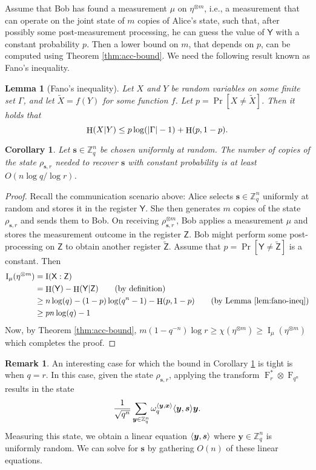 \documentclass[11pt]{article}
\theoremstyle{plain}
\newtheorem{lemma}[theorem]{Lemma}
\newtheorem{corollary}[theorem]{Corollary}
\theoremstyle{definition}
\newtheorem*{remark}{Remark}
\DeclareMathOperator{\entpy}{H}
\DeclareMathOperator{\qft}{F}
\DeclarePairedDelimiter{\abs}{\lvert}{\rvert}
\let\ket\relax
\DeclarePairedDelimiter{\ket}{\lvert}{\rangle}
\DeclarePairedDelimiter{\lrang}{\langle}{\rangle}
\def\Z{\mathbb{Z}}
\begin{document}
Assume that Bob has found a measurement $\mu$ on $\eta^{\otimes m}$, i.e., a measurement that can operate on the joint state of $m$ copies of Alice's state, such that, after possibly some post-measurement processing, he can guess the value of $\mathsf{Y}$ with a constant probability $p$. Then a lower bound on $m$, that depends on $p$, can be computed using Theorem \ref{thm:acc-bound}. We need the following result known as Fano's inequality.
\begin{lemma}[Fano’s inequality]
    \label{lem:fano-ineq}
    Let $X$ and $Y$ be random variables on some finite set $\Gamma$, and let $\tilde{X} = f(Y)$ for some function $f$. Let $p = \Pr[X \ne \tilde{X}]$. Then it holds that
    \[ \entpy(X \vert Y) \le p\log(\abs{\Gamma} - 1) + \entpy(p, 1 - p). \]
\end{lemma}
\begin{corollary}
    \label{cor:lower-b}
    Let $\bm{s} \in \Z_q^n$ be chosen uniformly at random. The number of copies of the state $\rho_{\bm{s}, r}$ needed to recover $\bm{s}$ with constant probability is at least $O(n\log q / \log r)$.
\end{corollary}
\begin{proof}
    Recall the communication scenario above: Alice selects $\bm{s} \in \Z_q^n$ uniformly at random and stores it in the register $\mathsf{Y}$. She then generates $m$ copies of the state $\rho_{\bm{s}, r}$ and sends them to Bob. On receiving $\rho_{\bm{s}, r}^{\otimes m}$, Bob applies a measurement $\mu$ and stores the measurement outcome in the register $\mathsf{Z}$. Bob might perform some post-processing on $\mathsf{Z}$ to obtain another register $\tilde{\mathsf{Z}}$. Assume that $p = \Pr[\mathsf{Y} \ne \tilde{\mathsf{Z}}]$ is a constant. Then
    \begin{align*}
        \operatorname{I}_\mu(\eta^{\otimes m})
        & = \operatorname{I}(\mathsf{X} : \mathsf{Z}) \\
        & = \entpy(\mathsf{Y}) - \entpy(\mathsf{Y} \vert \mathsf{Z}) \tag{by definition} \\
        & \ge n\log(q) - (1 - p)\log(q^n - 1) - \entpy(p, 1 - p) \tag{by Lemma \ref{lem:fano-ineq}} \\
        & \ge pn\log(q) - 1
    \end{align*}
    Now, by Theorem \ref{thm:acc-bound}, $m(1 - q^{-n})\log r \ge \chi(\eta^{\otimes m}) \ge \operatorname{I}_\mu(\eta^{\otimes m})$ which completes the proof.
\end{proof}
\begin{remark}
    \label{rmk:edcp-extreme}
    An interesting case for which the bound in Corollary \ref{cor:lower-b} is tight is when $q = r$. In this case, given the state $\rho_{\bm{s}, r}$, applying the transform $\qft_r^* \otimes \qft_{q^n}$ results in the state
    \[ \frac{1}{\sqrt{q^n}} \sum_{\bm{y} \in \Z_q^n} \omega_q^{\lrang{\bm{y}, \bm{x}}} \ket{\lrang{\bm{y}, \bm{s}}}\ket{\bm{y}}. \]
    Measuring this state, we obtain a linear equation $\lrang{\bm{y}, \bm{s}}$ where $\bm{y} \in \Z_q^n$ is uniformly random. We can solve for $\bm{s}$ by gathering $O(n)$ of these linear equations. 
\end{remark}
\end{document}
